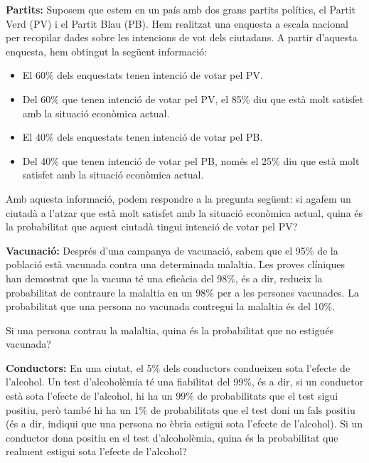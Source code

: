 \documentclass[12pt]{article}
\begin{document}
\begin{exercici} \noindent 
\textbf{Partits:} Suposem que estem en un país amb dos grans partits polítics, el Partit Verd (PV) i el Partit Blau (PB). Hem realitzat una enquesta a escala nacional per recopilar dades sobre les intencions de vot dels ciutadans. A partir d'aquesta enquesta, hem obtingut la següent informació:

\begin{itemize}
    \item El 60\% dels enquestats tenen intenció de votar pel PV.
    \item Del 60\% que tenen intenció de votar pel PV, el 85\% diu que està molt satisfet amb la situació econòmica actual.
    \item El 40\% dels enquestats tenen intenció de votar pel PB.
    \item Del 40\% que tenen intenció de votar pel PB, només el 25\% diu que està molt satisfet amb la situació econòmica actual.
\end{itemize}

Amb aquesta informació, podem respondre a la pregunta següent: si agafem un ciutadà a l'atzar que està molt satisfet amb la situació econòmica actual, quina és la probabilitat que aquest ciutadà tingui intenció de votar pel PV?
\end{exercici}

\begin{exercici} \noindent 
\textbf{Vacunació:} Després d'una campanya de vacunació, sabem que el 95\% de la població està vacunada contra una determinada malaltia. Les proves clíniques han demostrat que la vacuna té una eficàcia del 98\%, és a dir, redueix la probabilitat de contraure la malaltia en un 98\% per a les persones vacunades. La probabilitat que una persona no vacunada contregui la malaltia és del 10\%.

Si una persona contrau la malaltia, quina és la probabilitat que no estigués vacunada?
\end{exercici}

\begin{exercici} \noindent 
\textbf{Conductors:} En una ciutat, el 5\% dels conductors condueixen sota l'efecte de l'alcohol. Un test d'alcoholèmia té una fiabilitat del 99\%, és a dir, si un conductor està sota l'efecte de l'alcohol, hi ha un 99\% de probabilitats que el test sigui positiu, però també hi ha un 1\% de probabilitats que el test doni un fals positiu (és a dir, indiqui que una persona no èbria estigui sota l'efecte de l'alcohol). Si un conductor dona positiu en el test d'alcoholèmia, quina és la probabilitat que realment estigui sota l'efecte de l'alcohol?
\end{exercici}
\end{document}
